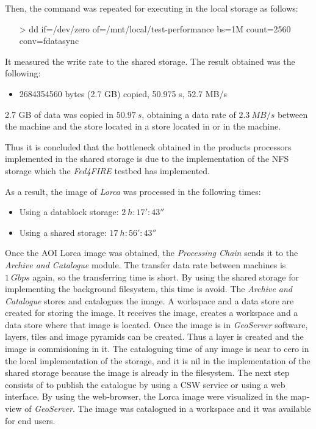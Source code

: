 Then, the command was repeated for executing in the local storage as follows:
\begin{itemize}
\item[>] dd if=/dev/zero of=/mnt/local/test-performance bs=1M count=2560
  conv=fdatasync
\end{itemize}

It measured the write rate to the shared storage. The result obtained was the
following:
\begin{itemize}
\item 2684354560 bytes (2.7 GB) copied, 50.975 s, 52.7 MB/s
\end{itemize}
2.7 GB of data was copied in $50.97~s$, obtaining a data rate  of $2.3~MB/s$ between the \bonfire machine and
the store located in a store located in \bonfire or in the machine.

Thus it is concluded that the bottleneck obtained in the products processors
implemented in the shared storage is due to the implementation of the \ac{NFS}
storage which the
\emph{Fed4FIRE} testbed has implemented.

As a result, the image of \emph{Lorca} was processed in the following
times:
\begin{itemize}
\item Using a datablock storage: $2~h:17':43''$
\item Using a shared storage: $17~h:56':43''$
\end{itemize}


Once the \ac{AOI} Lorca image was obtained, the \emph{Processing Chain} sends it
to the \emph{Archive and Catalogue} module. The transfer data rate between
\bonfire machines is $1~Gbps$ again, so the transferring time is short. By using the shared storage for
implementing the background filesystem, this time is avoid. The \emph{Archive
  and Catalogue} stores and catalogues the image. A workspace and a data store
are created for storing the image. It receives the image, creates a workspace and a data
store where that image is located. Once the image is in \emph{GeoServer}
software, layers, tiles and image pyramids can be created. Thus a layer is
created and the image is commisioning in it. The cataloguing time of any image
is near to cero in the local implementation of the storage, and it is nil in the implementation of the shared
storage because the image is already in the filesystem. 
The next step consists of to publish the catalogue by using
a \ac{CSW} service or using a web interface. By using the web-browser, the Lorca
image were visualized in the map-view of \emph{GeoServer}. The image was
catalogued in a workspace and it was available for end users.


